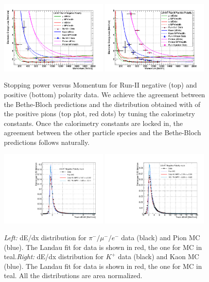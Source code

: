 \begin{figure}[htb]
\centering
\includegraphics[width=0.48\textwidth]{Chapter-5/Images/RunIINegTotaldEdXvsMomentum.png}
\includegraphics[width=0.48\textwidth]{Chapter-5/Images/RunIIPosTotaldEdXvsMomentum.png}
\caption{Stopping power versus Momentum for Run-II negative (top) and positive (bottom) polarity data. We achieve the agreement between the Bethe-Bloch predictions and the distribution obtained with of the positive pions (top plot, red dots) by tuning the calorimetry constants. Once the calorimetry constants are locked in, the agreement between the other particle species and the Bethe-Bloch predictions follows naturally.}
\label{fig:BBandData}
\end{figure}


\begin{figure}[htb]
\centering
\includegraphics[width=0.48\textwidth]{AppendixC-EnergyCalibration/dEdXPions.pdf}
\includegraphics[width=0.48\textwidth]{AppendixC-EnergyCalibration/dEdXKaons.pdf}
\caption{\emph{Left:} dE/dx distribution for $\pi^-/\mu^-/e^-$ data (black) and Pion MC (blue). The Landau fit for data is shown in red, the one for MC in teal.\emph{Right:} dE/dx distribution for $K^+$ data (black) and Kaon MC (blue). The Landau fit for data is shown in red, the one for MC in teal. All the distributions are area normalized.}
\label{fig:dedx}
\end{figure}


